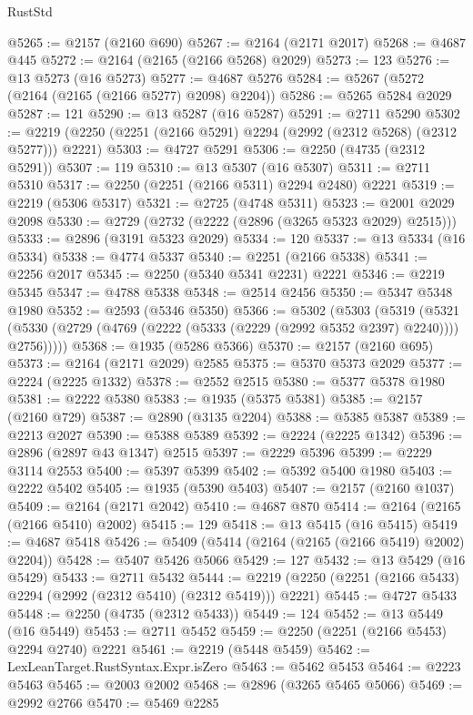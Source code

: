 \begin{lexlean}{RustStd}
\begin{coremodule}
@5265 := @2157 (@2160 @690)
@5267 := @2164 (@2171 @2017)
@5268 := @4687 @445
@5272 := @2164 (@2165 (@2166 @5268) @2029)
@5273 := 123
@5276 := @13 @5273 (@16 @5273)
@5277 := @4687 @5276
@5284 := @5267 (@5272 (@2164 (@2165 (@2166 @5277) @2098) @2204))
@5286 := @5265 @5284 @2029
@5287 := 121
@5290 := @13 @5287 (@16 @5287)
@5291 := @2711 @5290
@5302 := @2219 (@2250 (@2251 (@2166 @5291) @2294 (@2992 (@2312 @5268) (@2312 @5277))) @2221)
@5303 := @4727 @5291
@5306 := @2250 (@4735 (@2312 @5291))
@5307 := 119
@5310 := @13 @5307 (@16 @5307)
@5311 := @2711 @5310
@5317 := @2250 (@2251 (@2166 @5311) @2294 @2480) @2221
@5319 := @2219 (@5306 @5317)
@5321 := @2725 (@4748 @5311)
@5323 := @2001 @2029 @2098
@5330 := @2729 (@2732 (@2222 (@2896 (@3265 @5323 @2029) @2515)))
@5333 := @2896 (@3191 @5323 @2029)
@5334 := 120
@5337 := @13 @5334 (@16 @5334)
@5338 := @4774 @5337
@5340 := @2251 (@2166 @5338)
@5341 := @2256 @2017
@5345 := @2250 (@5340 @5341 @2231) @2221
@5346 := @2219 @5345
@5347 := @4788 @5338
@5348 := @2514 @2456
@5350 := @5347 @5348 @1980
@5352 := @2593 (@5346 @5350)
@5366 := @5302
    (@5303
      (@5319
        (@5321 (@5330 (@2729 (@4769 (@2222 (@5333 (@2229 (@2992 @5352 @2397) @2240)))) @2756)))))
@5368 := @1935 (@5286 @5366)
@5370 := @2157 (@2160 @695)
@5373 := @2164 (@2171 @2029) @2585
@5375 := @5370 @5373 @2029
@5377 := @2224 (@2225 @1332)
@5378 := @2552 @2515
@5380 := @5377 @5378 @1980
@5381 := @2222 @5380
@5383 := @1935 (@5375 @5381)
@5385 := @2157 (@2160 @729)
@5387 := @2890 (@3135 @2204)
@5388 := @5385 @5387
@5389 := @2213 @2027
@5390 := @5388 @5389
@5392 := @2224 (@2225 @1342)
@5396 := @2896 (@2897 @43 @1347) @2515
@5397 := @2229 @5396
@5399 := @2229 @3114 @2553
@5400 := @5397 @5399
@5402 := @5392 @5400 @1980
@5403 := @2222 @5402
@5405 := @1935 (@5390 @5403)
@5407 := @2157 (@2160 @1037)
@5409 := @2164 (@2171 @2042)
@5410 := @4687 @870
@5414 := @2164 (@2165 (@2166 @5410) @2002)
@5415 := 129
@5418 := @13 @5415 (@16 @5415)
@5419 := @4687 @5418
@5426 := @5409 (@5414 (@2164 (@2165 (@2166 @5419) @2002) @2204))
@5428 := @5407 @5426 @5066
@5429 := 127
@5432 := @13 @5429 (@16 @5429)
@5433 := @2711 @5432
@5444 := @2219 (@2250 (@2251 (@2166 @5433) @2294 (@2992 (@2312 @5410) (@2312 @5419))) @2221)
@5445 := @4727 @5433
@5448 := @2250 (@4735 (@2312 @5433))
@5449 := 124
@5452 := @13 @5449 (@16 @5449)
@5453 := @2711 @5452
@5459 := @2250 (@2251 (@2166 @5453) @2294 @2740) @2221
@5461 := @2219 (@5448 @5459)
@5462 := LexLeanTarget.RustSyntax.Expr.isZero
@5463 := @5462 @5453
@5464 := @2223 @5463
@5465 := @2003 @2002
@5468 := @2896 (@3265 @5465 @5066)
@5469 := @2992 @2766
@5470 := @5469 @2285

\end{coremodule}
\end{lexlean}
